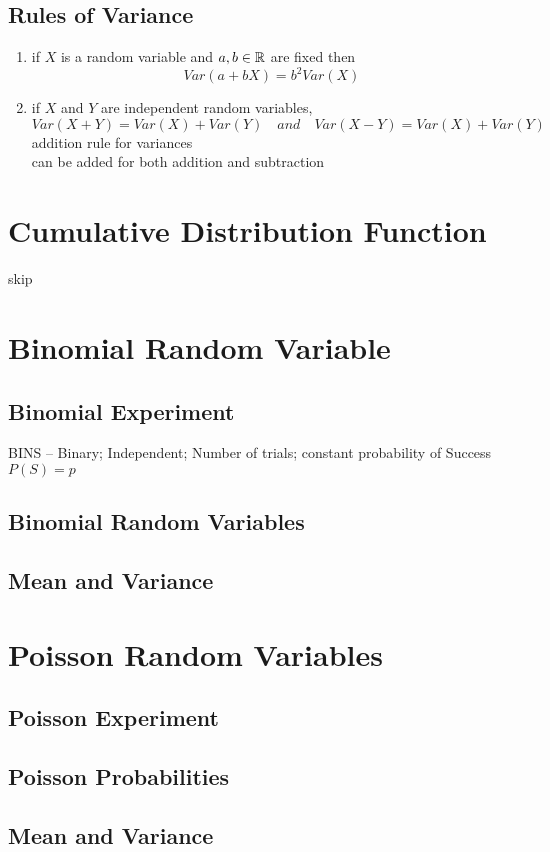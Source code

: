 \subsection{Rules of Variance}  %
\begin{enumerate}
    \item if $X$ is a random variable and $a, b\in\RR$ are fixed then 
    \begin{equation}
        Var(a+bX)=b^2 Var(X)
    \end{equation} 
    \item if $X$ and $Y$ are independent random variables, 
    \begin{equation}
        Var(X+Y)=Var(X)+Var(Y)\quad and\quad Var(X-Y)=Var(X)+Var(Y)
    \end{equation}
    addition rule for variances \\
    can be added for both addition and subtraction \\
    
\end{enumerate}

\section{Cumulative Distribution Function}  %
skip

\section{Binomial Random Variable}  %
\subsection{Binomial Experiment}  %
BINS -- Binary; Independent; Number of trials; constant probability of Success $P(S)=p$
\subsection{Binomial Random Variables}  %

\subsection{Mean and Variance}  %

\section{Poisson Random Variables}  %
\subsection{Poisson Experiment}  %
\subsection{Poisson Probabilities}  %
\subsection{Mean and Variance}  %

